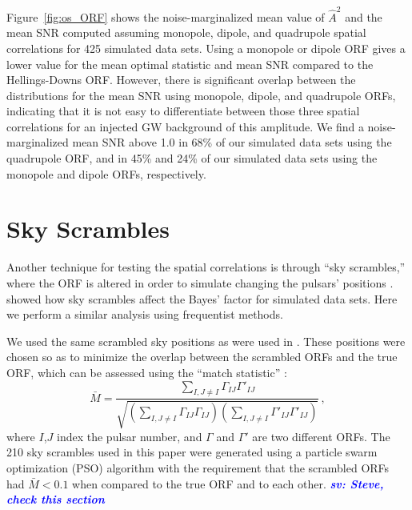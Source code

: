 \documentclass[twocolumn,aps,prd,superscriptaddress]{revtex4-1}
\newcommand{\sv}[1]{\textcolor{blue}{\it{\textbf{sv: #1}}} }
\newcommand{\Agw}{\ensuremath{A_\mathrm{gw}}}
\begin{document}
Figure~\ref{fig:os_ORF} shows the noise-marginalized mean value of $\hat{A}^2$ and the mean SNR 
computed assuming monopole, dipole, and quadrupole spatial correlations 
for 425 simulated data sets. Using a monopole or dipole ORF 
gives a lower value for the mean optimal statistic and mean SNR compared to the 
Hellings-Downs ORF. 
However, there is significant overlap between the distributions for the mean SNR using 
monopole, dipole, and quadrupole ORFs, indicating that it is not easy to differentiate 
between those three spatial correlations for an injected GW background of this amplitude. 
We find a noise-marginalized mean SNR above 1.0 in 68\% of our simulated data sets 
using the quadrupole ORF, and in 45\% and 24\% of our simulated data sets 
using the monopole and dipole ORFs, respectively.


\section{Sky Scrambles}
\label{sec:skyscrambles}

Another technique for testing the spatial correlations is through ``sky scrambles,'' 
where the ORF is altered in order to simulate changing the pulsars' positions \citep{cs2016}. 
\citet{tlb+2017} showed how sky scrambles affect the Bayes' factor for simulated data sets. 
Here we perform a similar analysis using frequentist methods.

We used the same scrambled sky positions as were used in \citet{tlb+2017}. 
These positions were chosen so as to minimize the overlap  
between the scrambled ORFs and the true ORF, 
which can be assessed using the ``match statistic'' \citep{cs2016}:
\begin{equation}
	\bar{M} = \frac{\sum_{I,J \neq I} \Gamma_{IJ} \Gamma'_{IJ}}{\sqrt{ \left( \sum_{I, J \neq I} \Gamma_{IJ} \Gamma_{IJ} \right) \left( \sum_{I, J \neq I} \Gamma'_{IJ} \Gamma'_{IJ} \right)}} \,,
\end{equation}
where $I$,$J$ index the pulsar number, and $\Gamma$ and $\Gamma'$ are two different ORFs. 
The 210 sky scrambles used in this paper were generated 
using a particle swarm optimization (PSO) algorithm \citep{ke1995,se1998} 
with the requirement that the scrambled ORFs had $\bar{M} < 0.1$ when compared to the true ORF and to each other.
\sv{Steve, check this section}
\end{document}
